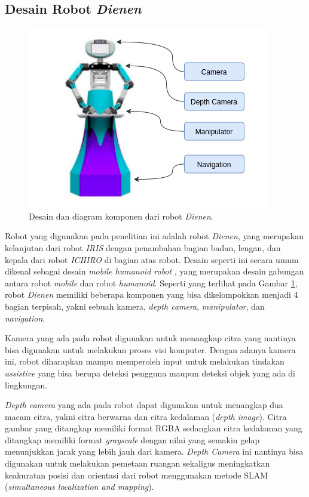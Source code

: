\subsection{Desain Robot \emph{Dienen}}
\label{subsec:desainrobotdienen}

\begin{figure} [ht]
  \centering
  \includegraphics[scale=0.5]{gambar/komponen-robot.png}
  \caption{Desain dan diagram komponen dari robot \emph{Dienen}.}
  \label{fig:komponenrobot}
\end{figure}

Robot yang digunakan pada penelitian ini adalah robot \emph{Dienen},
  yang merupakan kelanjutan dari robot \emph{IRIS} \citep{cit:dikairono2020}\citep{cit:zanuar2019} dengan penambahan bagian badan, lengan, dan kepala dari robot \emph{ICHIRO} \citep{cit:muhtadin2019} di bagian atas robot.
Desain seperti ini secara umum dikenal sebagai desain \emph{mobile humanoid robot} \citep{cit:mohamed2012}, yang merupakan desain gabungan antara robot \emph{mobile} dan robot \emph{humanoid}.
Seperti yang terlihat pada Gambar \ref{fig:komponenrobot},
  robot \emph{Dienen} memiliki beberapa komponen yang bisa dikelompokkan menjadi 4 bagian terpisah, yakni sebuah kamera, \emph{depth camera}, \emph{manipulator}, dan \emph{navigation}.

Kamera yang ada pada robot digunakan untuk menangkap citra yang nantinya bisa digunakan untuk melakukan proses visi komputer.
Dengan adanya kamera ini, robot diharapkan mampu memperoleh input untuk melakukan tindakan \emph{assistive} yang bisa berupa deteksi pengguna maupun deteksi objek yang ada di lingkungan.

\emph{Depth camera} yang ada pada robot dapat digunakan untuk menangkap dua macam citra,
  yakni citra berwarna dan citra kedalaman (\emph{depth image}).
Citra gambar yang ditangkap memiliki format RGBA sedangkan citra kedalaman yang ditangkap memiliki format \emph{grayscale} dengan nilai yang semakin gelap menunjukkan jarak yang lebih jauh dari kamera.
\emph{Depth Camera} ini nantinya bisa digunakan untuk melakukan pemetaan ruangan sekaligus meningkatkan keakuratan posisi dan orientasi dari robot menggunakan metode SLAM (\emph{simultaneous localization and mapping}).

